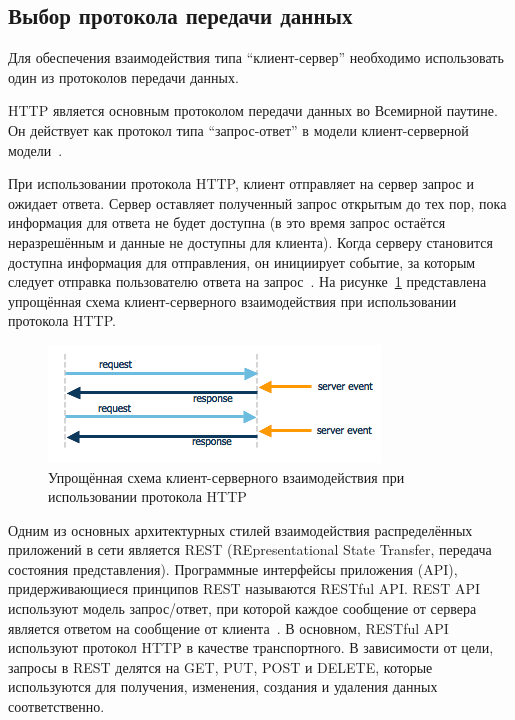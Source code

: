 \subsection{Выбор протокола передачи данных}

Для обеспечения взаимодействия типа ``клиент-сервер'' необходимо использовать один из протоколов передачи данных.

HTTP является основным протоколом передачи данных во Всемирной паутине. Он действует как протокол типа ``запрос-ответ'' в модели клиент-серверной модели~\cite{http_websockets}.

При использовании протокола HTTP, клиент отправляет на сервер запрос и ожидает ответа. Сервер оставляет полученный запрос открытым до тех пор, пока информация для ответа не будет доступна (в это время запрос остаётся неразрешённым и данные не доступны для клиента). Когда серверу становится доступна информация для отправления, он инициирует событие, за которым следует отправка пользователю ответа на запрос~\cite{http_websockets}. На рисунке~\ref{img:http__schema} представлена упрощённая схема клиент-серверного взаимодействия при использовании протокола HTTP.

\begin{figure}[H]
  \centering
  \includegraphics[height=0.15\textheight]{assets/images/theoretical2/http_schema.png}
  \caption{Упрощённая схема клиент-серверного взаимодействия при использовании протокола HTTP}
  \label{img:http__schema}
\end{figure}

Одним из основных архитектурных стилей взаимодействия распределённых приложений в сети является REST (REpresentational State Transfer, передача состояния представления). Программные интерфейсы приложения (API), придерживающиеся принципов REST называются RESTful API. REST API используют модель запрос/ответ, при которой каждое сообщение от сервера является ответом на сообщение от клиента~\cite{http_websockets}. В основном, RESTful API используют протокол HTTP в качестве транспортного. В зависимости от цели, запросы в REST делятся на GET, PUT, POST и DELETE, которые используются для получения, изменения, создания и удаления данных соответственно.

